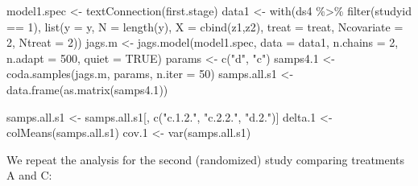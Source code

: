 \documentclass[
  letterpaper,
  DIV=11,
  numbers=noendperiod]{scrreprt}
\newenvironment{Shaded}{\begin{snugshade}}{\end{snugshade}}
\newcommand{\AttributeTok}[1]{\textcolor[rgb]{0.40,0.45,0.13}{#1}}
\newcommand{\ConstantTok}[1]{\textcolor[rgb]{0.56,0.35,0.01}{#1}}
\newcommand{\DecValTok}[1]{\textcolor[rgb]{0.68,0.00,0.00}{#1}}
\newcommand{\FloatTok}[1]{\textcolor[rgb]{0.68,0.00,0.00}{#1}}
\newcommand{\FunctionTok}[1]{\textcolor[rgb]{0.28,0.35,0.67}{#1}}
\newcommand{\NormalTok}[1]{\textcolor[rgb]{0.00,0.23,0.31}{#1}}
\newcommand{\OtherTok}[1]{\textcolor[rgb]{0.00,0.23,0.31}{#1}}
\newcommand{\SpecialCharTok}[1]{\textcolor[rgb]{0.37,0.37,0.37}{#1}}
\newcommand{\StringTok}[1]{\textcolor[rgb]{0.13,0.47,0.30}{#1}}
\begin{document}
\begin{Shaded}
\begin{Highlighting}[]
\NormalTok{model1.spec }\OtherTok{\textless{}{-}} \FunctionTok{textConnection}\NormalTok{(first.stage) }
\NormalTok{data1 }\OtherTok{\textless{}{-}} \FunctionTok{with}\NormalTok{(ds4 }\SpecialCharTok{\%\textgreater{}\%} \FunctionTok{filter}\NormalTok{(studyid }\SpecialCharTok{==} \DecValTok{1}\NormalTok{), }
              \FunctionTok{list}\NormalTok{(}\AttributeTok{y =}\NormalTok{ y,}
                   \AttributeTok{N =} \FunctionTok{length}\NormalTok{(y), }
                   \AttributeTok{X =} \FunctionTok{cbind}\NormalTok{(z1,z2),  }
                   \AttributeTok{treat =}\NormalTok{ treat,}
                   \AttributeTok{Ncovariate =} \DecValTok{2}\NormalTok{, }
                   \AttributeTok{Ntreat =} \DecValTok{2}\NormalTok{))}
\NormalTok{jags.m }\OtherTok{\textless{}{-}} \FunctionTok{jags.model}\NormalTok{(model1.spec, }\AttributeTok{data =}\NormalTok{ data1, }\AttributeTok{n.chains =} \DecValTok{2}\NormalTok{, }\AttributeTok{n.adapt =} \DecValTok{500}\NormalTok{,}
                     \AttributeTok{quiet =}  \ConstantTok{TRUE}\NormalTok{)}
\NormalTok{params }\OtherTok{\textless{}{-}} \FunctionTok{c}\NormalTok{(}\StringTok{"d"}\NormalTok{, }\StringTok{"c"}\NormalTok{) }
\NormalTok{samps4}\FloatTok{.1} \OtherTok{\textless{}{-}} \FunctionTok{coda.samples}\NormalTok{(jags.m, params, }\AttributeTok{n.iter =} \DecValTok{50}\NormalTok{)}
\NormalTok{samps.all.s1 }\OtherTok{\textless{}{-}} \FunctionTok{data.frame}\NormalTok{(}\FunctionTok{as.matrix}\NormalTok{(samps4}\FloatTok{.1}\NormalTok{))}

\NormalTok{samps.all.s1 }\OtherTok{\textless{}{-}}\NormalTok{ samps.all.s1[, }\FunctionTok{c}\NormalTok{(}\StringTok{"c.1.2."}\NormalTok{, }\StringTok{"c.2.2."}\NormalTok{, }\StringTok{"d.2."}\NormalTok{)]}
\NormalTok{delta}\FloatTok{.1} \OtherTok{\textless{}{-}} \FunctionTok{colMeans}\NormalTok{(samps.all.s1)}
\NormalTok{cov}\FloatTok{.1} \OtherTok{\textless{}{-}} \FunctionTok{var}\NormalTok{(samps.all.s1)}
\end{Highlighting}
\end{Shaded}

We repeat the analysis for the second (randomized) study comparing
treatments A and C:
\end{document}
